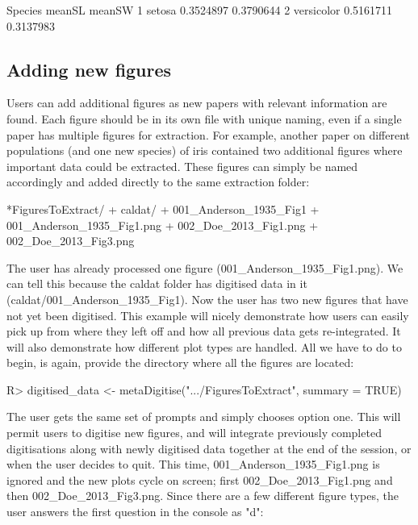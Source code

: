 \documentclass[article]{jss}
\begin{document}
\begin{CodeChunk}
\begin{CodeOutput}
     Species    meanSL    meanSW
1     setosa 0.3524897 0.3790644
2 versicolor 0.5161711 0.3137983
\end{CodeOutput}
\end{CodeChunk}



\subsection{Adding new figures}

Users can add additional figures as new papers with relevant information are found. Each figure should be in its own file with unique naming, even if a single paper has multiple figures for extraction. For example, another paper on different populations (and one new species) of iris contained two additional figures where important data could be extracted. These figures can simply be named accordingly and added directly to the same extraction folder: 

\begin{CodeChunk}
\begin{CodeOutput}
*FiguresToExtract/
    + caldat/
        + 001_Anderson_1935_Fig1
    + 001_Anderson_1935_Fig1.png
    + 002_Doe_2013_Fig1.png
    + 002_Doe_2013_Fig3.png
\end{CodeOutput}
\end{CodeChunk}

The user has already processed one figure (001\_Anderson\_1935\_Fig1.png). We can tell this because the caldat folder has digitised data in it (caldat/001\_Anderson\_1935\_Fig1). Now the user has two new figures that have not yet been digitised. This example will nicely demonstrate how users can easily pick up from where they left off and how all previous data gets re-integrated. It will also demonstrate how different plot types are handled. All we have to do to begin, is again, provide the directory where all the figures are located:

\begin{CodeChunk}
\begin{CodeInput}
R> digitised_data <- metaDigitise(".../FiguresToExtract", summary = TRUE)
\end{CodeInput}
\end{CodeChunk}

The user gets the same set of prompts and simply chooses option one. This will permit users to digitise new figures, and will integrate previously completed digitisations along with newly digitised data together at the end of the session, or when the user decides to quit. This time, 001\_Anderson\_1935\_Fig1.png is ignored and the new plots cycle on screen; first 002\_Doe\_2013\_Fig1.png and then 002\_Doe\_2013\_Fig3.png. Since there are a few different figure types, the user answers the first question in the  console as "d":
\end{document}
